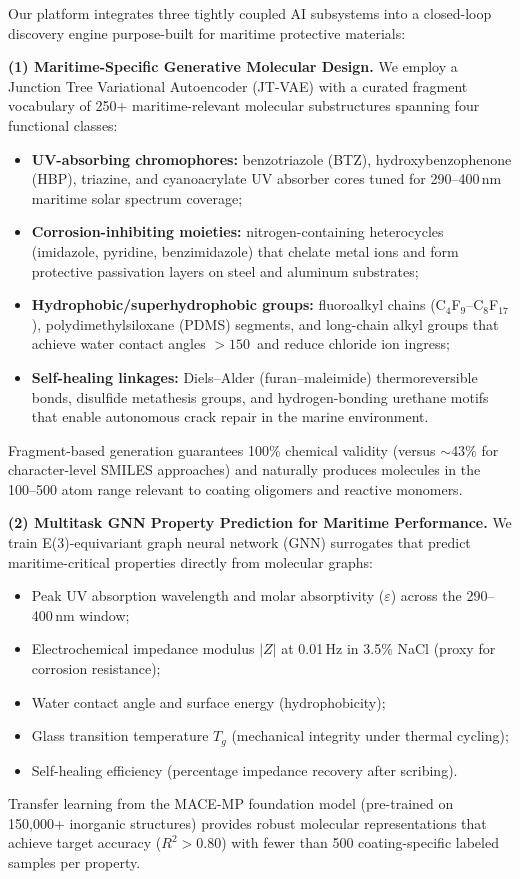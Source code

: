 \documentclass[11pt,letterpaper]{article}
\begin{document}
Our platform integrates three tightly coupled AI subsystems into a closed-loop
discovery engine purpose-built for maritime protective materials:

\textbf{(1) Maritime-Specific Generative Molecular Design.}
We employ a Junction Tree Variational Autoencoder (JT-VAE) with a curated
fragment vocabulary of 250+ maritime-relevant molecular substructures spanning
four functional classes:
\begin{itemize}[nosep]
  \item \textbf{UV-absorbing chromophores:} benzotriazole (BTZ),
    hydroxybenzophenone (HBP), triazine, and cyanoacrylate UV absorber cores
    tuned for 290--400\,nm maritime solar spectrum coverage;
  \item \textbf{Corrosion-inhibiting moieties:} nitrogen-containing heterocycles
    (imidazole, pyridine, benzimidazole) that chelate metal ions and form
    protective passivation layers on steel and aluminum substrates;
  \item \textbf{Hydrophobic/superhydrophobic groups:} fluoroalkyl chains
    (C$_4$F$_9$--C$_8$F$_{17}$), polydimethylsiloxane (PDMS) segments, and
    long-chain alkyl groups that achieve water contact angles $>150$\textdegree\
    and reduce chloride ion ingress;
  \item \textbf{Self-healing linkages:} Diels--Alder (furan--maleimide)
    thermoreversible bonds, disulfide metathesis groups, and hydrogen-bonding
    urethane motifs that enable autonomous crack repair in the marine environment.
\end{itemize}
Fragment-based generation guarantees 100\% chemical validity (versus $\sim$43\%
for character-level SMILES approaches) and naturally produces molecules in the
100--500 atom range relevant to coating oligomers and reactive monomers.

\textbf{(2) Multitask GNN Property Prediction for Maritime Performance.}
We train E(3)-equivariant graph neural network (GNN) surrogates that predict
maritime-critical properties directly from molecular graphs:
\begin{itemize}[nosep]
  \item Peak UV absorption wavelength and molar absorptivity ($\varepsilon$)
    across the 290--400\,nm window;
  \item Electrochemical impedance modulus $|Z|$ at 0.01\,Hz in 3.5\% NaCl
    (proxy for corrosion resistance);
  \item Water contact angle and surface energy (hydrophobicity);
  \item Glass transition temperature $T_g$ (mechanical integrity under thermal
    cycling);
  \item Self-healing efficiency (percentage impedance recovery after scribing).
\end{itemize}
Transfer learning from the MACE-MP foundation model (pre-trained on 150,000+
inorganic structures) provides robust molecular representations that achieve
target accuracy ($R^2 > 0.80$) with fewer than 500 coating-specific labeled
samples per property.
\end{document}
